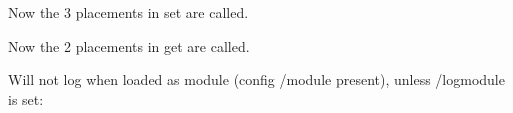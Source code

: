 Now the 3 placements in set are called.


\begin{DoxyCode}{0}
\end{DoxyCode}


Now the 2 placements in get are called.

Will not log when loaded as module (config {\ttfamily /module} present), unless {\ttfamily /logmodule} is set\+:


\begin{DoxyCode}{0}
\end{DoxyCode}
 